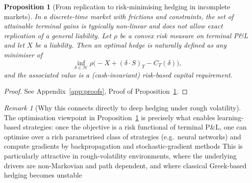 \documentclass[12pt,a4paper]{article}
\theoremstyle{definition}
\theoremstyle{plain}
\newtheorem{proposition}{Proposition}[section]
\theoremstyle{remark}
\newtheorem{remark}{Remark}[section]
\theoremstyle{plain}
\begin{document}
\begin{proposition}[From replication to risk-minimising hedging in incomplete markets]
\label{prop:replication_to_risk_min}
In a discrete-time market with frictions and constraints, the set of attainable terminal gains is typically non-linear and does not allow exact replication of a general liability.
Let $\rho$ be a convex risk measure on terminal P\&L and let $X$ be a liability.
Then an optimal hedge is naturally defined as any minimiser of
\[
\inf_{\delta\in\mathcal H}\rho\bigl(-X + (\delta\cdot S)_T - C_T(\delta)\bigr),
\]
and the associated value is a (cash-invariant) risk-based capital requirement. 
\end{proposition}

\begin{proof}
See Appendix~\ref{app:proofs}, Proof of Proposition~\ref{prop:replication_to_risk_min}.
\end{proof}

\begin{remark}[Why this connects directly to deep hedging under rough volatility]\label{rem:deep_hedging_connection}
The optimisation viewpoint in Proposition~\ref{prop:replication_to_risk_min} is precisely what enables learning-based strategies: once the objective is a risk functional of terminal P\&L, one can optimise over a rich parametrised class of strategies (e.g.\ neural networks) and compute gradients by backpropagation and stochastic-gradient methods \cite{Buehler2019DeepHedging,HighamHigham2019DeepLearning}
This is particularly attractive in rough-volatility environments, where the underlying drivers are non-Markovian and path dependent, and where classical Greek-based hedging becomes unstable \cite{GatheralRough,BayerFriz2016,Horvath2021DeepRough}
\end{remark}
\end{document}
